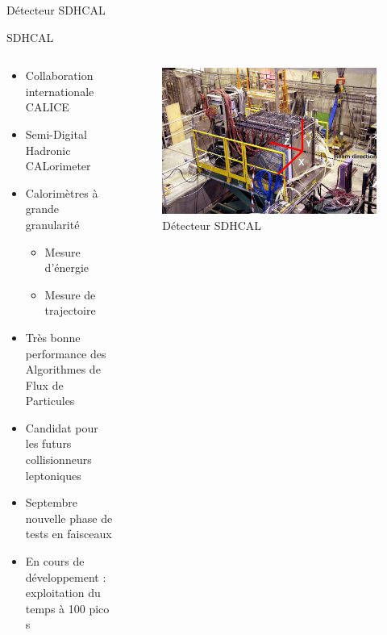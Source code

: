 \documentclass[9pt]{beamer}
\begin{document}
\begin{frame}{Détecteur SDHCAL}
    \begin{block}{SDHCAL}

        \begin{columns}
            \begin{column}{0.5\textwidth}
                \begin{itemize}
                    \item Collaboration internationale CALICE
                    \item Semi-Digital Hadronic CALorimeter
                    \item Calorimètres à grande granularité
                    \begin{itemize}
                        \item Mesure d'énergie
                        \item Mesure de trajectoire
                        
                    \end{itemize}
                    \item Très bonne performance des Algorithmes de Flux de Particules
                    \item Candidat pour les futurs collisionneurs leptoniques
                    \item Septembre nouvelle phase de tests en faisceaux
                    \item En cours de développement : exploitation du temps à 100 pico s
                \end{itemize}
            \end{column}
	
            \begin{column}{0.45\textwidth}
                \begin{figure}
                    \center
                    \includegraphics[width=\textwidth]{../img/SDHCAL.png}
                    \caption{Détecteur SDHCAL}
                    \label{detector}
                \end{figure}
            \end{column}
        \end{columns}
    \end{block}
\end{frame}
\end{document}
